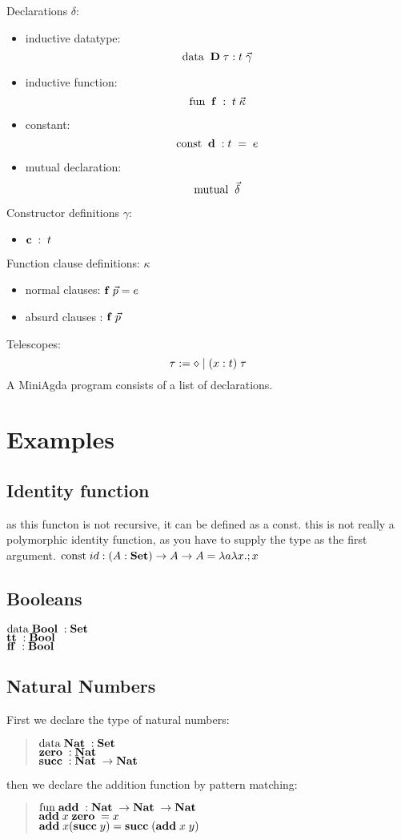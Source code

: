 Declarations $\delta$:
\begin{itemize}
\item
inductive datatype: 
\[\mathrm{data}\; \; \mathbf{D} \; \tau : t \; \vec{\gamma}\]  
\item
inductive function:
\[\mathrm{fun}\; \; \mathbf{f} \; : \; t \; \vec{\kappa}\]
\item
constant:
\[\mathrm{const}\; \;  \mathbf{d} \; : t \; = \; e \]
\item
mutual declaration:
\[\mathrm{mutual}\; \; \vec{\delta}\]
\end{itemize}
Constructor definitions $\gamma$:
\begin{itemize}
\item
$ \mathbf{c} \; : \; t $ 
\end{itemize}
Function clause definitions: $ \kappa $
\begin{itemize}
\item
normal clauses: $ \mathbf{f} \; \vec{p} = e $
\item
absurd clauses : $ \mathbf{f} \; \vec{p} $
\end{itemize}
Telescopes:
\[ \tau := \diamond \;\vert\; ( x : t ) \; \tau \]
A MiniAgda program consists of a list of declarations.
\section{Examples}
\subsection{Identity function}
as this functon is not recursive, it can be defined as a const.
this is not really a polymorphic identity function, as you have to supply the
type as the first argument.
$\mathrm{const}\; id : ( A : \mathbf{Set} ) \rightarrow A \rightarrow A = \lambda a \lambda x . ; x$   
\subsection{Booleans}
$\mathrm{data}\; \mathbf{Bool}\; : \mathbf{Set}$ 
\\
$\mathbf{tt}\; : \mathbf{Bool}\; $
\\
$\mathbf{ff}\; : \mathbf{Bool}\; $
\subsection{Natural Numbers}
First we declare the type of natural numbers:
\begin{quote}
$\mathrm{data}\; \mathbf{Nat}\; : \mathbf{Set}$ 
\\
$\mathbf{zero}\; : \mathbf{Nat}\; $
\\
$\mathbf{succ}\; : \mathbf{Nat}\; \rightarrow \mathbf{Nat}\; $
\end{quote}
then we declare the addition function by pattern matching:
\begin{quote}
$\mathrm{fun}\; \mathbf{add}\; : \mathbf{Nat}\; \rightarrow \mathbf{Nat}\; \rightarrow \mathbf{Nat}\;$
\\
$\mathbf{add}\; x \; \mathbf{zero}\; = x $
\\
$\mathbf{add}\; x (\mathbf{succ}\; y) = \mathbf{succ}\; ( \mathbf{add}\; x \; y)  $
\end{quote}
